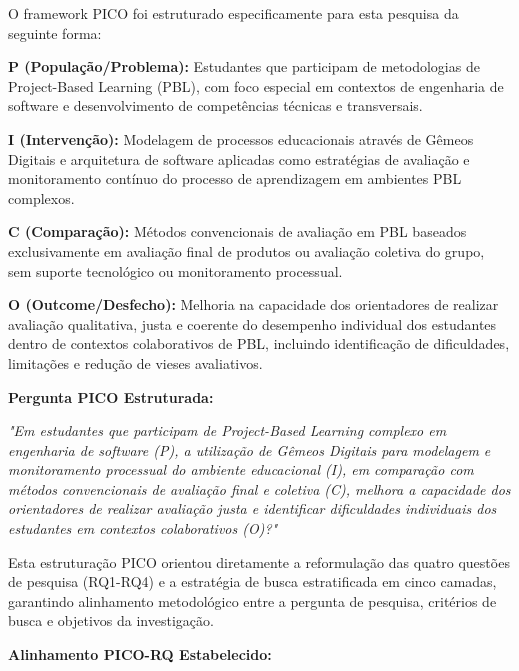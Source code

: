 \documentclass[english, spanish, brazilian]{RBIEarticle} %
\begin{document}
O framework PICO foi estruturado especificamente para esta pesquisa da seguinte forma:

\textbf{P (População/Problema):} Estudantes que participam de metodologias de Project-Based Learning (PBL), com foco especial em contextos de engenharia de software e desenvolvimento de competências técnicas e transversais.

\textbf{I (Intervenção):} Modelagem de processos educacionais através de Gêmeos Digitais e arquitetura de software aplicadas como estratégias de avaliação e monitoramento contínuo do processo de aprendizagem em ambientes PBL complexos.

\textbf{C (Comparação):} Métodos convencionais de avaliação em PBL baseados exclusivamente em avaliação final de produtos ou avaliação coletiva do grupo, sem suporte tecnológico ou monitoramento processual.

\textbf{O (Outcome/Desfecho):} Melhoria na capacidade dos orientadores de realizar avaliação qualitativa, justa e coerente do desempenho individual dos estudantes dentro de contextos colaborativos de PBL, incluindo identificação de dificuldades, limitações e redução de vieses avaliativos.

\textbf{Pergunta PICO Estruturada:}

\textit{"Em estudantes que participam de Project-Based Learning complexo em engenharia de software (P), a utilização de Gêmeos Digitais para modelagem e monitoramento processual do ambiente educacional (I), em comparação com métodos convencionais de avaliação final e coletiva (C), melhora a capacidade dos orientadores de realizar avaliação justa e identificar dificuldades individuais dos estudantes em contextos colaborativos (O)?"}

Esta estruturação PICO orientou diretamente a reformulação das quatro questões de pesquisa (RQ1-RQ4) e a estratégia de busca estratificada em cinco camadas, garantindo alinhamento metodológico entre a pergunta de pesquisa, critérios de busca e objetivos da investigação.

\textbf{Alinhamento PICO-RQ Estabelecido:}
\end{document}
